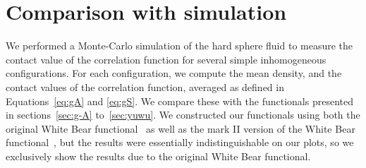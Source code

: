 \documentclass[letterpaper,twocolumn,amsmath,amssymb,pre]{revtex4-1}
\begin{document}




\section{Comparison with simulation}\label{sec:comparison}

We performed a Monte-Carlo simulation of the hard sphere fluid to
measure the contact value of the correlation function for several
simple inhomogeneous configurations.  For each configuration, we
compute the mean density, and the contact values of the correlation
function, averaged as defined in Equations~\ref{eq:gA} and
\ref{eq:gS}.  We compare these with the functionals presented in
sections~\ref{sec:g-A} to~\ref{sec:yuwu}.  We constructed our
functionals using both the original White Bear
functional~\cite{roth2002whitebear} as well as the mark II version of
the White Bear functional~\cite{hansen2006density}, but the results
were essentially indistinguishable on our plots, so we exclusively
show the results due to the original White Bear functional.
\end{document}
